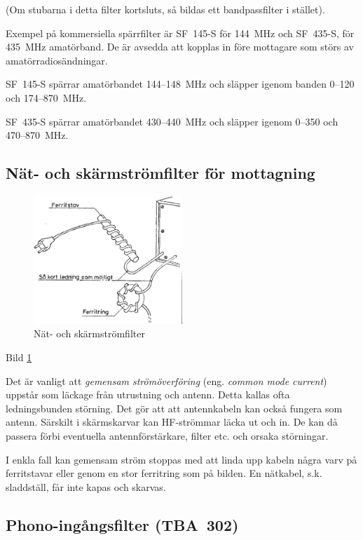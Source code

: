 (Om stubarna i detta filter kortsluts, så bildas ett bandpassfilter i
stället).

Exempel på kommersiella spärrfilter är SF~145-S för 144~MHz och
SF~435-S, för 435~MHz amatörband. De är avsedda att kopplas in före
mottagare som störs av amatörradiosändningar.

SF~145-S spärrar amatörbandet 144--148~MHz och släpper igenom banden
0--120 och 174--870~MHz.

SF~435-S spärrar amatörbandet 430--440~MHz och släpper igenom
0--350 och 470--870~MHz.

\subsection{Nät- och skärmströmfilter för mottagning}

\begin{figure}
  \includegraphics[width=0.5\textwidth]{images/cropped_pdfs/bild_2_9-07.pdf}
  \caption{Nät- och skärmströmfilter}
  \label{fig:bildII9-7}
\end{figure}

Bild \ref{fig:bildII9-7}

Det är vanligt att \emph{gemensam strömöverföring} (eng.
\emph{common mode current}) uppstår som läckage från utrustning och antenn.
Detta kallas ofta ledningsbunden störning.
Det gör att att antennkabeln kan också fungera som antenn. Särskilt
i skärmskarvar kan HF-strömmar läcka ut och in. De kan då passera förbi
eventuella antennförstärkare, filter etc. och orsaka störningar.

I enkla fall kan gemensam ström stoppas med att linda upp kabeln
några varv på ferritstavar eller genom en stor ferritring som på
bilden. En nätkabel, s.k. sladdställ, får inte kapas och skarvas.

\subsection{Phono-ingångsfilter (TBA~302)}


